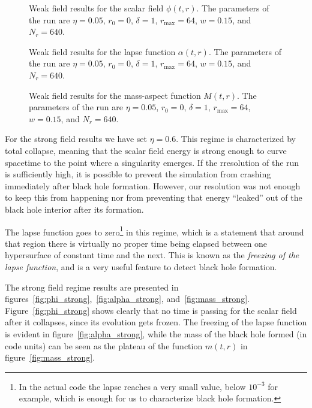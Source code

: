 \documentclass[a4paper,11pt]{article}
\renewcommand{\a}{\alpha}
\begin{document}
\begin{figure}[H]
  \centering
  
  \caption[Weak field results for the scalar field $\phi(t,r)$.]{Weak field results for the scalar field $\phi(t,r)$. The parameters of the run are $\eta=0.05$, $r_{0}=0$, $\delta=1$, $r_{\max}=64$, $w=0.15$, and $N_{r}=640$.}
  \label{fig:phi_weak}
\end{figure}

\begin{figure}[H]
  \centering
  
  \caption[Weak field results for the lapse function $\a(t,r)$.]{Weak field results for the lapse function $\a(t,r)$. The parameters of the run are $\eta=0.05$, $r_{0}=0$, $\delta=1$, $r_{\max}=64$, $w=0.15$, and $N_{r}=640$.}
  \label{fig:alpha_weak}
\end{figure}

\begin{figure}[H]
  \centering
  
  \caption[Weak field results for the mass-aspect function $M(t,r)$.]{Weak field results for the mass-aspect function $M(t,r)$. The parameters of the run are $\eta=0.05$, $r_{0}=0$, $\delta=1$, $r_{\max}=64$, $w=0.15$, and $N_{r}=640$.}
  \label{fig:mass_weak}
\end{figure}

For the strong field results we have set $\eta=0.6$. This regime is characterized by total collapse, meaning that the scalar field energy is strong enough to curve spacetime to the point where a singularity emerges. If the rresolution of the run is sufficiently high, it is possible to prevent the simulation from crashing immediately after black hole formation. However, our resolution was not enough to keep this from happening nor from preventing that energy ``leaked'' out of the black hole interior after its formation.

The lapse function goes to zero\footnote{In the actual code the lapse reaches a very small value, below $10^{-3}$ for example, which is enough for us to characterize black hole formation.} in this regime, which is a statement that around that region there is virtually no proper time being elapsed between one hypersurface of constant time and the next. This is known as the \emph{freezing of the lapse function}, and is a very useful feature to detect black hole formation.

The strong field regime results are presented in figures~\ref{fig:phi_strong},~\ref{fig:alpha_strong}, and~\ref{fig:mass_strong}. Figure~\ref{fig:phi_strong} shows clearly that no time is passing for the scalar field after it collapses, since its evolution gets frozen. The freezing of the lapse function is evident in figure~\ref{fig:alpha_strong}, while the mass of the black hole formed (in code units) can be seen as the plateau of the function $m(t,r)$ in figure~\ref{fig:mass_strong}.
\end{document}
